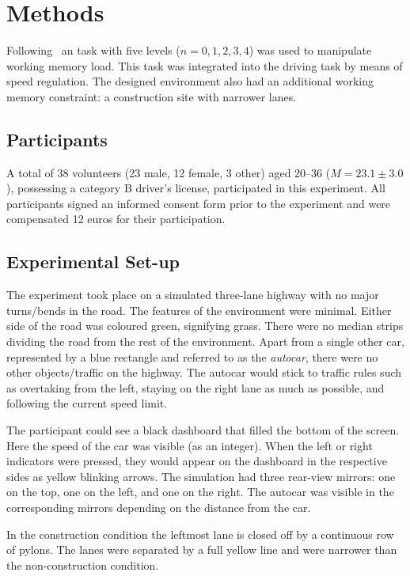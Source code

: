 
\section{Methods}\label{sec:methods}
Following~\cite{Unni2017} an \nback task with five levels (\(n = 0,1,2,3,4\)) was used to manipulate working memory load. 
This task was integrated into the driving task by means of speed regulation. 
The designed environment also had an additional working memory constraint: a construction site with narrower lanes.  

\subsection{Participants}
A total of 38 volunteers (23 male, 12 female, 3 other) aged 20--36 (\(M = 23.1 \pm 3.0\)), possessing a category B driver's license, participated in this experiment. 
All participants signed an informed consent form prior to the experiment and were compensated 12 euros for their participation.

\subsection{Experimental Set-up}
The experiment took place on a simulated three-lane highway with no major turns/bends in the road. 
The features of the environment were minimal. 
Either side of the road was coloured green, signifying grass. 
There were no median strips dividing the road from the rest of the environment. 
Apart from a single other car, represented by a blue rectangle and referred to as the \textit{autocar}, there were no other objects/traffic on the highway. 
The autocar would stick to traffic rules such as overtaking from the left, staying on the right lane as much as possible, and following the current speed limit. 

The participant could see a black dashboard that filled the bottom of the screen. 
Here the speed of the car was visible (as an integer). 
When the left or right indicators were pressed, they would appear on the dashboard in the respective sides as yellow blinking arrows. 
The simulation had three rear-view mirrors: one on the top, one on the left, and one on the right. 
The autocar was visible in the corresponding mirrors depending on the distance from the car. 

In the construction condition the leftmost lane is closed off by a continuous row of pylons. 
The lanes were separated by a full yellow line and were narrower than the non-construction condition. 

